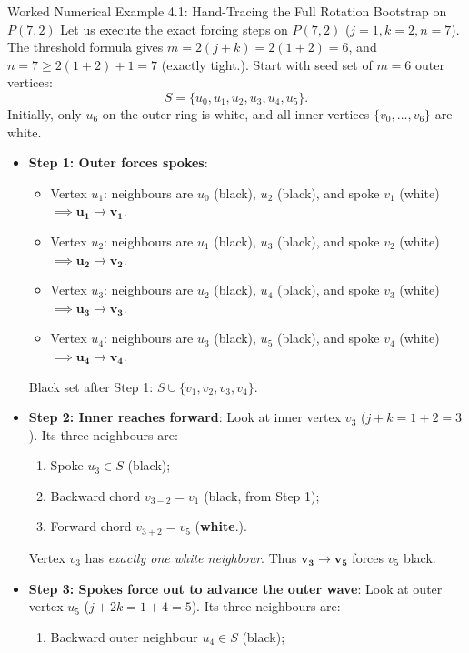 \documentclass[11pt]{article}
\begin{document}
\begin{callbox}{Worked Numerical Example 4.1: Hand-Tracing the Full Rotation Bootstrap on $P(7,2)$}
Let us execute the exact forcing steps on $P(7,2)$ ($j=1, k=2, n=7$). 
The threshold formula gives $m = 2(j+k) = 2(1+2) = 6$, and $n = 7 \ge 2(1+2)+1 = 7$ (exactly tight.).
Start with seed set of $m=6$ outer vertices:
\begin{equation}
  S = \{u_0, u_1, u_2, u_3, u_4, u_5\}.
\end{equation}
Initially, only $u_6$ on the outer ring is white, and all inner vertices $\{v_0, \dots, v_6\}$ are white.
\begin{itemize}[leftmargin=*,nosep]
  \item \textbf{Step 1: Outer forces spokes}:
  \begin{itemize}[leftmargin=*,nosep]
    \item Vertex $u_1$: neighbours are $u_0$ (black), $u_2$ (black), and spoke $v_1$ (white) $\implies \mathbf{u_1 \to v_1}$.
    \item Vertex $u_2$: neighbours are $u_1$ (black), $u_3$ (black), and spoke $v_2$ (white) $\implies \mathbf{u_2 \to v_2}$.
    \item Vertex $u_3$: neighbours are $u_2$ (black), $u_4$ (black), and spoke $v_3$ (white) $\implies \mathbf{u_3 \to v_3}$.
    \item Vertex $u_4$: neighbours are $u_3$ (black), $u_5$ (black), and spoke $v_4$ (white) $\implies \mathbf{u_4 \to v_4}$.
  \end{itemize}
  Black set after Step 1: $S \cup \{v_1, v_2, v_3, v_4\}$.
  \item \textbf{Step 2: Inner reaches forward}:
  Look at inner vertex $v_3$ ($j+k = 1+2 = 3$). Its three neighbours are:
  \begin{enumerate}[leftmargin=*,nosep]
    \item Spoke $u_3 \in S$ (black);
    \item Backward chord $v_{3-2} = v_1$ (black, from Step 1);
    \item Forward chord $v_{3+2} = v_5$ (\textbf{white}.).
  \end{enumerate}
  Vertex $v_3$ has \emph{exactly one white neighbour}. Thus $\mathbf{v_3 \to v_5}$ forces $v_5$ black.
  \item \textbf{Step 3: Spokes force out to advance the outer wave}:
  Look at outer vertex $u_5$ ($j+2k = 1+4 = 5$). Its three neighbours are:
  \begin{enumerate}[leftmargin=*,nosep]
    \item Backward outer neighbour $u_4 \in S$ (black);

\end{enumerate}
\end{itemize}
\end{callbox}
\end{document}
